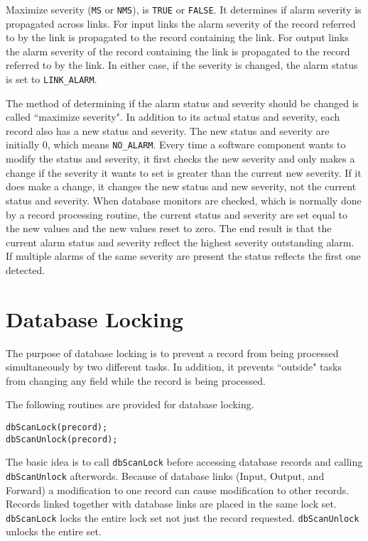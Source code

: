 Maximize severity (\verb|MS| or \verb|NMS|), is \verb|TRUE| or \verb|FALSE|.  It determines if alarm severity is propagated across links. For input 
links the alarm severity of the record referred to by the link is propagated to the record containing the link. For output 
links the alarm severity of the record containing the link is propagated to the record referred to by the link. In either case, 
if the severity is changed, the alarm status is set to \verb|LINK_ALARM|.

The method of determining if the alarm status and severity should be changed is called ``maximize severity". In addition 
to its actual status and severity, each record also has a new status and severity. The new status and severity are initially 0, 
which means \verb|NO_ALARM|. Every time a software component wants to modify the status and severity, it first checks the 
new severity and only makes a change if the severity it wants to set is greater than the current new severity. If it does make 
a change, it changes the new status and new severity, not the current status and severity. When database monitors are 
checked, which is normally done by a record processing routine, the current status and severity are set equal to the new 
values and the new values reset to zero. The end result is that the current alarm status and severity reflect the highest 
severity outstanding alarm. If multiple alarms of the same severity are present the status reflects the first one detected.

\section{Database Locking}

The purpose of database locking is to prevent a record from being processed simultaneously by two different tasks. In 
addition, it prevents ``outside" tasks from changing any field while the record is being processed.

The following routines are provided for database locking.

\begin{verbatim}
dbScanLock(precord);
dbScanUnlock(precord);
\end{verbatim}

The basic idea is to call \verb|dbScanLock| before accessing database records and calling \verb|dbScanUnlock| afterwords. 
Because of database links (Input, Output, and Forward) a modification to one record can cause modification to other 
records. Records linked together with database links are placed in the same lock set. \verb|dbScanLock| locks the entire lock 
set not just the record requested. \verb|dbScanUnlock| unlocks the entire set.

